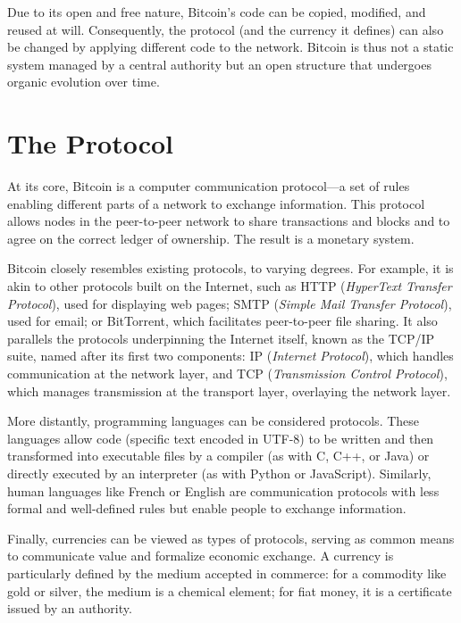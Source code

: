 \documentclass[
  a5paper,
  smalldemyvopaper,10pt,twoside,onecolumn,openright,extrafontsizes,hidelinks]{memoir}
\begin{document}
Due to its open and free nature, Bitcoin's code can be copied, modified,
and reused at will. Consequently, the protocol (and the currency it
defines) can also be changed by applying different code to the network.
Bitcoin is thus not a static system managed by a central authority but
an open structure that undergoes organic evolution over time.

\section*{The Protocol}\label{the-protocol}


At its core, Bitcoin is a computer communication protocol---a set of
rules enabling different parts of a network to exchange information.
This protocol allows nodes in the peer-to-peer network to share
transactions and blocks and to agree on the correct ledger of ownership.
The result is a monetary system.

Bitcoin closely resembles existing protocols, to varying degrees. For
example, it is akin to other protocols built on the Internet, such as
HTTP (\emph{HyperText Transfer Protocol}), used for displaying web
pages; SMTP (\emph{Simple Mail Transfer Protocol}), used for email; or
BitTorrent, which facilitates peer-to-peer file sharing. It also
parallels the protocols underpinning the Internet itself, known as the
TCP/IP suite, named after its first two components: IP (\emph{Internet
Protocol}), which handles communication at the network layer, and TCP
(\emph{Transmission Control Protocol}), which manages transmission at
the transport layer, overlaying the network layer.

More distantly, programming languages can be considered protocols. These
languages allow code (specific text encoded in UTF-8) to be written and
then transformed into executable files by a compiler (as with C, C++, or
Java) or directly executed by an interpreter (as with Python or
JavaScript). Similarly, human languages like French or English are
communication protocols with less formal and well-defined rules but
enable people to exchange information.

Finally, currencies can be viewed as types of protocols, serving as
common means to communicate value and formalize economic exchange. A
currency is particularly defined by the medium accepted in commerce: for
a commodity like gold or silver, the medium is a chemical element; for
fiat money, it is a certificate issued by an authority.
\end{document}
